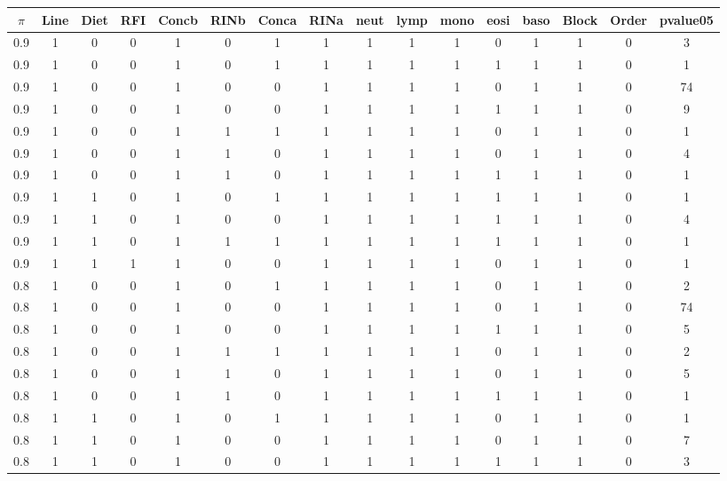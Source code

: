 \documentclass[12pt, letter]{article}\usepackage[]{graphicx}\usepackage[]{color}
\begin{document}
\begin{table}[ht]
\centering
{\scriptsize
\begin{tabular}{|c|cccccccccccccc|c|}
  \hline
$\pi$ & Line & Diet & RFI & Concb & RINb & Conca & RINa & neut & lymp & mono & eosi & baso & Block & Order & pvalue05 \\ 
  \hline
0.9 & 1 & 0 & 0 & 1 & 0 & 1 & 1 & 1 & 1 & 1 & 0 & 1 & 1 & 0 & 3 \\ 
  0.9 & 1 & 0 & 0 & 1 & 0 & 1 & 1 & 1 & 1 & 1 & 1 & 1 & 1 & 0 & 1 \\ 
  0.9 & 1 & 0 & 0 & 1 & 0 & 0 & 1 & 1 & 1 & 1 & 0 & 1 & 1 & 0 & 74 \\ 
  0.9 & 1 & 0 & 0 & 1 & 0 & 0 & 1 & 1 & 1 & 1 & 1 & 1 & 1 & 0 & 9 \\ 
  0.9 & 1 & 0 & 0 & 1 & 1 & 1 & 1 & 1 & 1 & 1 & 0 & 1 & 1 & 0 & 1 \\ 
  0.9 & 1 & 0 & 0 & 1 & 1 & 0 & 1 & 1 & 1 & 1 & 0 & 1 & 1 & 0 & 4 \\ 
  0.9 & 1 & 0 & 0 & 1 & 1 & 0 & 1 & 1 & 1 & 1 & 1 & 1 & 1 & 0 & 1 \\ 
  0.9 & 1 & 1 & 0 & 1 & 0 & 1 & 1 & 1 & 1 & 1 & 1 & 1 & 1 & 0 & 1 \\ 
  0.9 & 1 & 1 & 0 & 1 & 0 & 0 & 1 & 1 & 1 & 1 & 1 & 1 & 1 & 0 & 4 \\ 
  0.9 & 1 & 1 & 0 & 1 & 1 & 1 & 1 & 1 & 1 & 1 & 1 & 1 & 1 & 0 & 1 \\ 
  0.9 & 1 & 1 & 1 & 1 & 0 & 0 & 1 & 1 & 1 & 1 & 0 & 1 & 1 & 0 & 1 \\ 
   \hline
0.8 & 1 & 0 & 0 & 1 & 0 & 1 & 1 & 1 & 1 & 1 & 0 & 1 & 1 & 0 & 2 \\ 
  0.8 & 1 & 0 & 0 & 1 & 0 & 0 & 1 & 1 & 1 & 1 & 0 & 1 & 1 & 0 & 74 \\ 
  0.8 & 1 & 0 & 0 & 1 & 0 & 0 & 1 & 1 & 1 & 1 & 1 & 1 & 1 & 0 & 5 \\ 
  0.8 & 1 & 0 & 0 & 1 & 1 & 1 & 1 & 1 & 1 & 1 & 0 & 1 & 1 & 0 & 2 \\ 
  0.8 & 1 & 0 & 0 & 1 & 1 & 0 & 1 & 1 & 1 & 1 & 0 & 1 & 1 & 0 & 5 \\ 
  0.8 & 1 & 0 & 0 & 1 & 1 & 0 & 1 & 1 & 1 & 1 & 1 & 1 & 1 & 0 & 1 \\ 
  0.8 & 1 & 1 & 0 & 1 & 0 & 1 & 1 & 1 & 1 & 1 & 0 & 1 & 1 & 0 & 1 \\ 
  0.8 & 1 & 1 & 0 & 1 & 0 & 0 & 1 & 1 & 1 & 1 & 0 & 1 & 1 & 0 & 7 \\ 
  0.8 & 1 & 1 & 0 & 1 & 0 & 0 & 1 & 1 & 1 & 1 & 1 & 1 & 1 & 0 & 3 \\ 

\end{tabular}}
\end{table}
\end{document}
